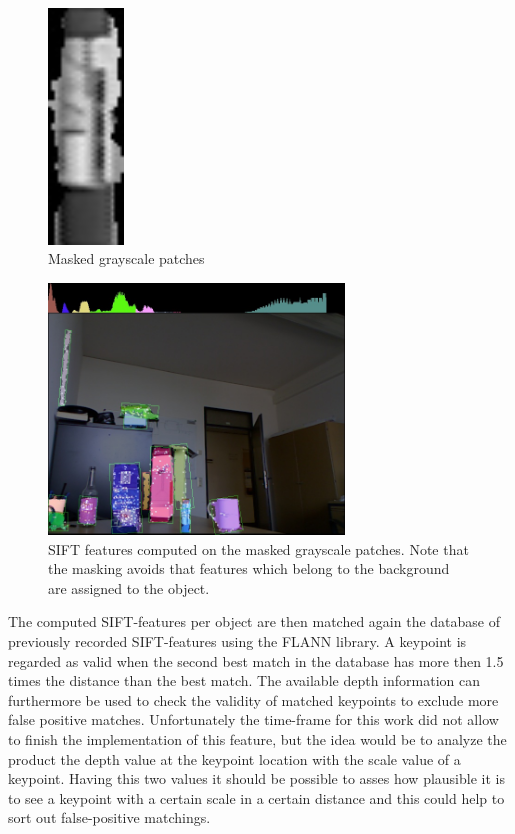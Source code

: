 \begin{figure}[ht]
        \hspace{0.1cm}              
        \includegraphics[width=2cm]{images/image_sift_89.jpg}
    \caption{Masked grayscale patches}
    \label{sg:fig:masked_patches}
\end{figure}

\begin{figure}[ht]
    \centering
        \includegraphics[width=0.7\textwidth]{images/contours_keypoints.jpg}
    \caption{SIFT features computed on the masked grayscale patches. Note that the masking avoids that features which belong to the background are assigned to the object.}
    \label{sg:fig:images_contours_keypoints}
\end{figure}

The computed SIFT-features per object are then matched again the database of previously recorded SIFT-features using the FLANN library. A keypoint is regarded as valid when the second best match in the database has more then 1.5 times the distance than the best match.
The available depth information can furthermore be used to check the validity of matched keypoints to exclude more false positive matches. Unfortunately the time-frame for this work did not allow to finish the implementation of this feature, but the idea would be to analyze the product the depth value at the keypoint location with the scale value of a keypoint. Having this two values it should be possible to asses how plausible it is to see a keypoint with a certain scale in a certain distance and this could help to sort out false-positive matchings.



